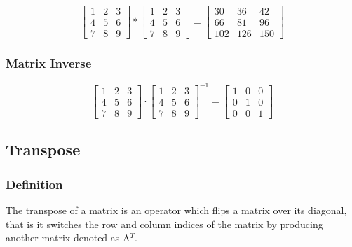 \documentclass[titlepage,a4paper]{article}
\begin{document}
			\begin{equation*}
				\left[
				\begin{matrix}
					1 & 2 & 3 \\
					4 & 5 & 6 \\
					7 & 8 & 9
				\end{matrix}
				\right]
				*
				\left[
				\begin{matrix}
					1 & 2 & 3 \\
					4 & 5 & 6 \\
					7 & 8 & 9
				\end{matrix}
				\right]
				=
				\left[
				\begin{matrix}
					30 & 36 & 42 \\
					66 & 81 & 96 \\
					102 & 126 & 150
				\end{matrix}
				\right]
			\end{equation*}
		\subsubsection{Matrix Inverse}

			\begin{equation*}
				\left[
				\begin{matrix}
					1 & 2 & 3 \\
					4 & 5 & 6 \\
					7 & 8 & 9
				\end{matrix}
				\right]
				\cdot
				\left[
				\begin{matrix}
					1 & 2 & 3 \\
					4 & 5 & 6 \\
					7 & 8 & 9
				\end{matrix}
				\right]^{-1}
				=
				\left[
				\begin{matrix}
					1 & 0 & 0 \\
					0 & 1 & 0 \\
					0 & 0 & 1
				\end{matrix}
				\right]
			\end{equation*}
	\subsection{Transpose}
		\subsubsection{Definition}
			The transpose of a matrix is an operator which flips a matrix over its diagonal, that is it switches the row and column indices of the matrix by producing another matrix denoted as A$^T$.
\end{document}
